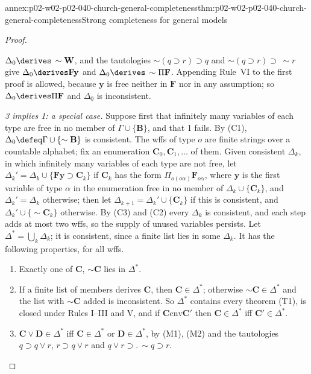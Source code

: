 \begin{annexitem}{annex:p02-w02-p02-040-church-general-completeness}{thm:p02-w02-p02-040-church-general-completeness}{Strong completeness for general models}
\begin{proof}
\begin{enumerate}
   \(\Delta_0\derives\,\sim\mathbf W\), and the tautologies
   \(\sim(q\supset r)\supset q\) and \(\sim(q\supset r)\supset\,\sim r\) give
   \(\Delta_0\derives\mathbf F\mathbf y\) and \(\Delta_0\derives\,\sim\Pi\mathbf F\).
   Appending Rule~VI to the first proof is allowed, because \(\mathbf y\) is free
   neither in \(\mathbf F\) nor in any assumption; so \(\Delta_0\derives\Pi\mathbf F\)
   and \(\Delta_0\) is inconsistent.
\end{enumerate}

\emph{3 implies 1: a special case.}  Suppose first that infinitely many
variables of each type are free in no member of \(\Gamma\cup\{\mathbf B\}\),
and that 1 fails.  By (C1), \(\Delta_0\defeq\Gamma\cup\{\sim\mathbf B\}\) is
consistent.  The wffs of type \(o\) are finite strings over a countable
alphabet; fix an enumeration \(\mathbf C_0,\mathbf C_1,\ldots\) of them.  Given
consistent \(\Delta_k\), in which infinitely many variables of each type are
not free, let \(\Delta_k'=\Delta_k\cup\{\mathbf F\mathbf y\supset\mathbf C_k\}\) if
\(\mathbf C_k\) has the form \(\Pi_{o(o\alpha)}\mathbf F_{o\alpha}\), where
\(\mathbf y\) is the first variable of type \(\alpha\) in the enumeration free in
no member of \(\Delta_k\cup\{\mathbf C_k\}\), and \(\Delta_k'=\Delta_k\) otherwise;
then let \(\Delta_{k+1}=\Delta_k'\cup\{\mathbf C_k\}\) if this is consistent, and
\(\Delta_k'\cup\{\sim\mathbf C_k\}\) otherwise.  By (C3) and (C2) every
\(\Delta_k\) is consistent, and each step adds at most two wffs, so the supply
of unused variables persists.  Let \(\Delta^*=\bigcup_k\Delta_k\); it is
consistent, since a finite list lies in some \(\Delta_k\).  It has the
following properties, for all wffs.
\begin{enumerate}
 \item[(M1)] Exactly one of \(\mathbf C\), \(\sim\mathbf C\) lies in \(\Delta^*\).
 \item[(M2)] If a finite list of members derives \(\mathbf C\), then
   \(\mathbf C\in\Delta^*\); otherwise \(\sim\mathbf C\in\Delta^*\) and the list with
   \(\sim\mathbf C\) added is inconsistent.  So \(\Delta^*\) contains every
   theorem (T1), is closed under Rules I--III and V, and if
   \(\mathbf C\mathrel{\mathrm{cnv}}\mathbf C'\) then \(\mathbf C\in\Delta^*\) iff \(\mathbf C'\in\Delta^*\).
 \item[(M3)] \(\mathbf C\vee\mathbf D\in\Delta^*\) iff \(\mathbf C\in\Delta^*\) or
   \(\mathbf D\in\Delta^*\), by (M1), (M2) and the tautologies
   \(q\supset q\vee r\), \(r\supset q\vee r\) and
   \(q\vee r\supset.\,\sim q\supset r\).

\end{enumerate}
\end{proof}
\end{annexitem}
